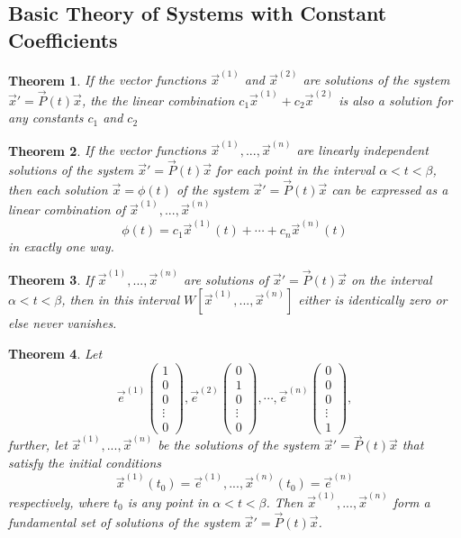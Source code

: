 \documentclass[10pt]{report}
\newtheorem{thm3}{Theorem}[subsection]
\begin{document}
\subsection{Basic Theory of Systems with Constant Coefficients}
\begin{thm3}
If the vector functions $\vec{x}^{(1)}$ and $\vec{x}^{(2)}$ are solutions of the system $\vec{x}'=\vec{P}(t)\vec{x}$, the the linear combination $c_1\vec{x}^{(1)}+c_2\vec{x}^{(2)}$ is also a solution for any constants $c_1$ and $c_2$
\end{thm3}
\begin{thm3}
If the vector functions $\vec{x}^{(1)},...,\vec{x}^{(n)}$ are linearly independent solutions of the system $\vec{x}' = \vec{P}(t)\vec{x}$ for each point in the interval $\alpha<t<\beta$, then each solution $\vec{x}=\phi(t)$ of the system $\vec{x}' = \vec{P}(t)\vec{x}$ can be expressed as a linear combination of $\vec{x}^{(1)},...,\vec{x}^{(n)}$
$$\phi(t) = c_1\vec{x}^{(1)}(t) + \cdots + c_n\vec{x}^{(n)}(t)$$
in exactly one way.
\end{thm3}
\begin{thm3}
If $\vec{x}^{(1)},...,\vec{x}^{(n)}$ are solutions of $\vec{x}' = \vec{P}(t)\vec{x}$ on the interval $\alpha<t<\beta$, then in this interval $W[\vec{x}^{(1)},...,\vec{x}^{(n)}]$ either is identically zero or else never vanishes.
\end{thm3}
\begin{thm3}
Let
$$\vec{e}^{(1)}\left(
\begin{array}{c}
1\\0\\0\\\vdots\\0
\end{array}\right),
\vec{e}^{(2)}\left(
\begin{array}{c}
0\\1\\0\\\vdots\\0
\end{array}\right),
\cdots, 
\vec{e}^{(n)}\left(
\begin{array}{c}
0\\0\\0\\\vdots\\1
\end{array}\right),$$
further, let $\vec{x}^{(1)},...,\vec{x}^{(n)}$ be the solutions of the system $\vec{x}' = \vec{P}(t)\vec{x}$ that satisfy the initial conditions
$$\vec{x}^{(1)}(t_0)=\vec{e}^{(1)},...,\vec{x}^{(n)}(t_0)=\vec{e}^{(n)}$$
respectively, where $t_0$ is any point in $\alpha<t<\beta$. Then $\vec{x}^{(1)},...,\vec{x}^{(n)}$ form a fundamental set of solutions of the system $\vec{x}' = \vec{P}(t)\vec{x}$.
\end{thm3}
\end{document}
